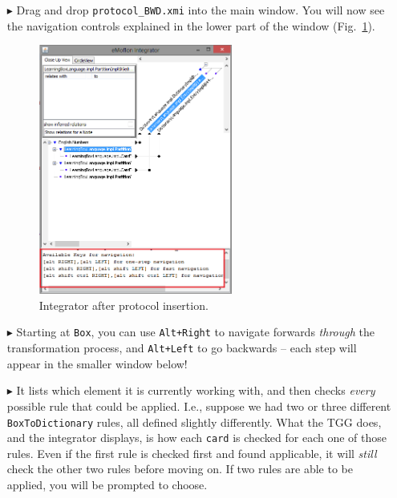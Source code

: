 \begin{itemize}
\item[$\blacktriangleright$] Drag and drop \texttt{protocol\_BWD.xmi} into the main window. You will now see the navigation controls explained in the lower part
of the window (Fig.~\ref{fig:integrator_after_protocol}).

\begin{figure}[h!]
\begin{center}
  \includegraphics[width=0.6\textwidth]{integrator_after_protocol_insertion.png}
  \caption{Integrator after protocol insertion.}
  \label{fig:integrator_after_protocol}
\end{center}
\end{figure} 

\item[$\blacktriangleright$]  Starting at \texttt{Box}, you can use \texttt{Alt+Right} to navigate forwards \emph{through} the transformation process, and
\texttt{Alt+Left} to go backwards -- each step will appear in the smaller window below!

\item[$\blacktriangleright$] It lists which element it is currently working with, and then checks \emph{every} possible rule that could be applied. I.e.,
suppose we had two or three different \texttt{BoxToDictionary} rules, all defined slightly differently. What the TGG does, and the integrator displays, is how
each \texttt{card} is checked for each one of those rules. Even if the first rule is checked first and found applicable, it will \emph{still} check the other
two rules before moving on. If two rules are able to be applied, you will be prompted to choose.


\end{itemize}
